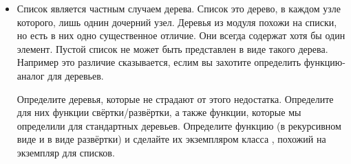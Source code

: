 \begin{itemize}
\item Список является частным случаем дерева. Список это
    дерево, в каждом узле которого, лишь однин дочерний узел.
    Деревья из модуля  похожи на списки, 
    но есть в них одно существенное отличие. Они всегда
    содержат хотя бы один элемент. Пустой список не может
    быть представлен в виде такого дерева. Например это 
    различие сказывается, еслим вы захотите определить 
    функцию-аналог  для деревьев. 

    Определите деревья, которые не страдают от этого
    недостатка. Определите для них функции свёртки/развёртки,
    а также функции, которые мы определили для стандартных
    деревьев. Определите функцию  (в рекурсивном
    виде и в виде развёртки)
    и сделайте их экземпляром класса , похожий
    на экземпляр для списков.

\end{itemize}

